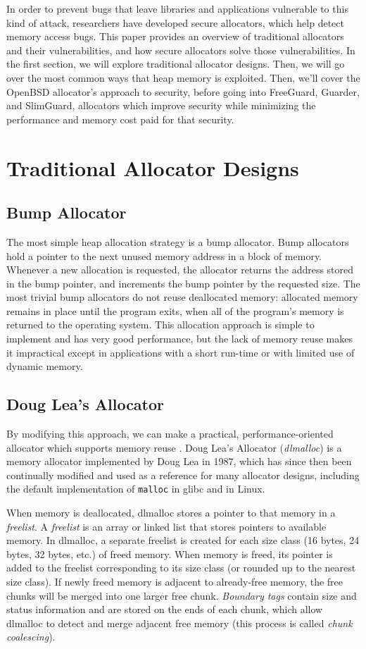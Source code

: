 \documentclass[conference]{IEEEtran}
\begin{document}
In order to prevent bugs that leave libraries and applications vulnerable to this kind of attack, researchers have developed secure allocators, which help detect memory access bugs.
This paper provides an overview of traditional allocators and their vulnerabilities, and how secure allocators solve those vulnerabilities.
In the first section, we will explore traditional allocator designs.
Then, we will go over the most common ways that heap memory is exploited.
Then, we'll cover the OpenBSD allocator's approach to security, before going into FreeGuard, Guarder, and SlimGuard, allocators which improve security while minimizing the performance and memory cost paid for that security.

\section{Traditional Allocator Designs}

\subsection{Bump Allocator}

The most simple heap allocation strategy is a bump allocator.
Bump allocators hold a pointer to the next unused memory address in a block of memory.
Whenever a new allocation is requested, the allocator returns the address stored in the bump pointer, and increments the bump pointer by the requested size.
The most trivial bump allocators do not reuse deallocated memory: allocated memory remains in place until the program exits, when all of the program's memory is returned to the operating system.
This allocation approach is simple to implement and has very good performance, but the lack of memory reuse makes it impractical except in applications with a short run-time or with limited use of dynamic memory.

\subsection{Doug Lea's Allocator}
By modifying this approach, we can make a practical, performance-oriented allocator which supports memory reuse \cite{dlmalloc}.
Doug Lea's Allocator (\emph{dlmalloc}) is a memory allocator implemented by Doug Lea in 1987, which has since then been continually modified and used as a reference for many allocator designs, including the default implementation of \verb|malloc| in glibc and in Linux.

When memory is deallocated, dlmalloc stores a pointer to that memory in a \emph{freelist}.
A \emph{freelist} is an array or linked list that stores pointers to available memory.
In dlmalloc, a separate freelist is created for each size class (16 bytes, 24 bytes, 32 bytes, etc.) of freed memory.
When memory is freed, its pointer is added to the freelist corresponding to its size class (or rounded up to the nearest size class).
If newly freed memory is adjacent to already-free memory, the free chunks will be merged into one larger free chunk.
\emph{Boundary tags} contain size and status information and are stored on the ends of each chunk, which allow dlmalloc to detect and merge adjacent free memory (this process is called \emph{chunk coalescing}).
\end{document}
